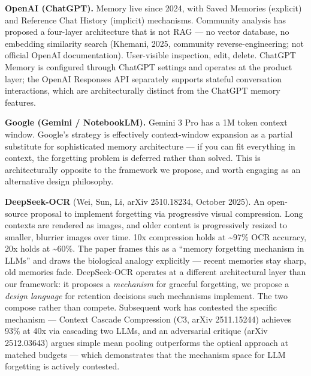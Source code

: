 \documentclass[
  11pt,
]{article}
\begin{document}
\textbf{OpenAI (ChatGPT).} Memory live since 2024, with Saved Memories
(explicit) and Reference Chat History (implicit) mechanisms. Community
analysis has proposed a four-layer architecture that is not RAG --- no
vector database, no embedding similarity search (Khemani, 2025,
community reverse-engineering; not official OpenAI documentation).
User-visible inspection, edit, delete. ChatGPT Memory is configured
through ChatGPT settings and operates at the product layer; the OpenAI
Responses API separately supports stateful conversation interactions,
which are architecturally distinct from the ChatGPT memory features.

\textbf{Google (Gemini / NotebookLM).} Gemini 3 Pro has a 1M token
context window. Google's strategy is effectively context-window
expansion as a partial substitute for sophisticated memory architecture
--- if you can fit everything in context, the forgetting problem is
deferred rather than solved. This is architecturally opposite to the
framework we propose, and worth engaging as an alternative design
philosophy.

\textbf{DeepSeek-OCR} (Wei, Sun, Li, arXiv 2510.18234, October 2025). An
open-source proposal to implement forgetting via progressive visual
compression. Long contexts are rendered as images, and older content is
progressively resized to smaller, blurrier images over time. 10x
compression holds at \textasciitilde97\% OCR accuracy, 20x holds at
\textasciitilde60\%. The paper frames this as a ``memory forgetting
mechanism in LLMs'' and draws the biological analogy explicitly ---
recent memories stay sharp, old memories fade. DeepSeek-OCR operates at
a different architectural layer than our framework: it proposes a
\emph{mechanism} for graceful forgetting, we propose a \emph{design
language} for retention decisions such mechanisms implement. The two
compose rather than compete. Subsequent work has contested the specific
mechanism --- Context Cascade Compression (C3, arXiv 2511.15244)
achieves 93\% at 40x via cascading two LLMs, and an adversarial critique
(arXiv 2512.03643) argues simple mean pooling outperforms the optical
approach at matched budgets --- which demonstrates that the mechanism
space for LLM forgetting is actively contested.
\end{document}
